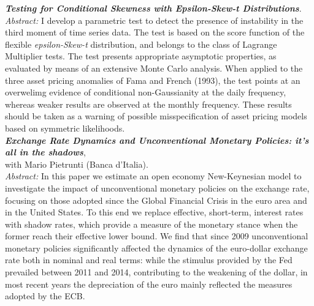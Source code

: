 \documentclass[a4paper,12pt]{article}
\begin{document}
\textit{\textbf{Testing for Conditional Skewness with Epsilon-Skew-t Distributions}}.\\[.2em]
\textit{Abstract:} I develop a parametric test to detect the presence of instability in the third moment of time series data. The test is based on the score function of the flexible \textit{epsilon-Skew-t} distribution, and belongs to the class of Lagrange Multiplier tests. The test presents appropriate asymptotic properties, as evaluated by means of an extensive Monte Carlo analysis. When applied to the three asset pricing anomalies of Fama and French (1993), the test points at an overwelimg evidence of conditional non-Gaussianity at the daily frequency, whereas weaker results are observed at the monthly frequency. These results should be taken as a warning of possible misspecification of asset pricing models based on symmetric likelihoods. \\[.5em]
\textit{\textbf{Exchange Rate Dynamics and Unconventional Monetary Policies: it’s all in the shadows}},\\ with Mario Pietrunti (Banca d'Italia).\\ %
\textit{Abstract:} In this paper we estimate an open economy New-Keynesian model to investigate the impact of unconventional monetary policies on the exchange rate, focusing on those adopted since the Global Financial Crisis in the euro area and in the United States. To this end we replace effective, short-term, interest rates with shadow rates, which provide a measure of the monetary stance when the former reach their effective lower bound. We find that since 2009 unconventional monetary policies significantly affected the dynamics of the euro-dollar exchange rate both in nominal and real terms: while the stimulus provided by the Fed prevailed between 2011 and 2014, contributing to the weakening of the dollar, in most recent years the depreciation of the euro mainly reflected the measures adopted by the ECB.
\end{document}

